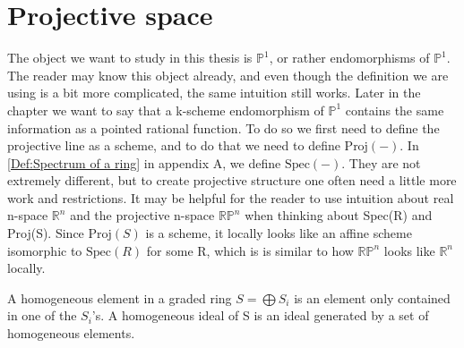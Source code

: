\section{Projective space}
%
The object we want to study in this thesis is \(\mathbb{P}^1\), or rather endomorphisms of \(\mathbb{P}^1\). The reader may know this object already, and even though the definition we are using is a bit more complicated, the same intuition still works. Later in the chapter we want to say that a k-scheme endomorphism of \(\mathbb{P}^1\) contains the same information as a pointed rational function. To do so we first need to define the projective line as a scheme, and to do that we need to define \(\text{Proj}(-)\). In \ref{Def:Spectrum of a ring} in appendix A, we define \(\text{Spec}(-)\). They are not extremely different, but to create projective structure one often need a little more work and restrictions. It may be helpful for the reader to use intuition about real n-space \(\mathbb{R}^n\) and the projective n-space \(\mathbb{RP}^n\) when thinking about Spec(R)  and Proj(S). Since \(\text{Proj}(S)\) is a scheme, it locally looks like an affine scheme isomorphic to \(\text{Spec}(R)\) for some R, which is is similar to how \(\mathbb{RP}^n\) looks like \(\mathbb{R}^n\) locally. 
%
\begin{definition}\label{Def:Homogeneous element}
%
A homogeneous element in a graded ring \(S= \bigoplus S_i\) is an element only contained in one of the \(S_i\)'s.
A homogeneous ideal of S is an ideal generated by a set of homogeneous elements. 
%
\end{definition}
%
